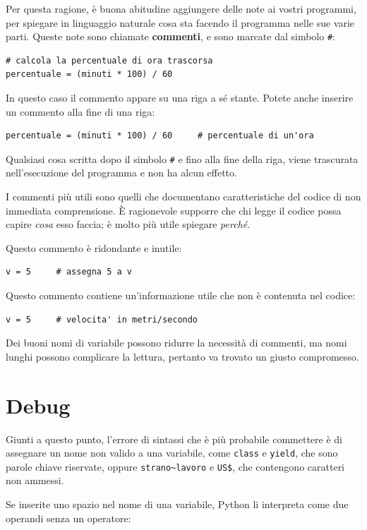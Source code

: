 \documentclass[10pt]{book}
\begin{document}
Per questa ragione, è buona abitudine aggiungere delle note ai vostri   programmi, per spiegare in linguaggio naturale cosa sta facendo il programma nelle sue varie parti. Queste note sono chiamate {\bf commenti}, e sono marcate dal simbolo \verb"#":

\begin{verbatim}
# calcola la percentuale di ora trascorsa
percentuale = (minuti * 100) / 60
\end{verbatim}
%
In questo caso il commento appare su una riga a sé stante. Potete anche inserire un commento alla fine di una riga:


\begin{verbatim}
percentuale = (minuti * 100) / 60     # percentuale di un'ora
\end{verbatim}
%
Qualsiasi cosa scritta dopo il simbolo {\tt \#} e fino alla fine della riga, viene trascurata nell'esecuzione del programma e non ha alcun effetto. 

I commenti più utili sono quelli che documentano caratteristiche del codice di non immediata comprensione. È ragionevole supporre che chi legge il codice possa capire {\em cosa} esso faccia; è molto più utile spiegare {\em perché}.

Questo commento è ridondante e inutile:

\begin{verbatim}
v = 5     # assegna 5 a v
\end{verbatim}
%
Questo commento contiene un'informazione utile che non è contenuta nel codice:

\begin{verbatim}
v = 5     # velocita' in metri/secondo 
\end{verbatim}
%
Dei buoni nomi di variabile possono ridurre la necessità di commenti, ma nomi lunghi possono complicare la lettura, pertanto va trovato un giusto compromesso.


\section{Debug}

Giunti a questo punto, l'errore di sintassi che è più probabile commettere è di assegnare un nome non valido a una variabile, come {\tt class} e {\tt yield}, che sono parole chiave riservate, oppure \verb"strano~lavoro" e \verb"US$", che contengono caratteri non ammessi.

Se inserite uno spazio nel nome di una variabile, Python li interpreta come due operandi senza un operatore:
\end{document}
